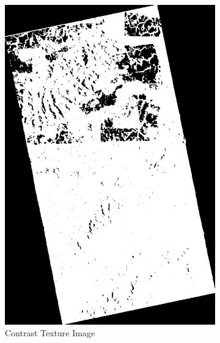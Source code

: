 \begin{figure}[H]
\begin{subfigure}[b]{0.4\linewidth}
    \includegraphics[width=\linewidth]{Chapter4/sum_and_diff_textures/contrastimage.png}
     \caption{Contrast Texture Image}
  \end{subfigure}
  \centering
  \begin{subfigure}[b]{0.4\linewidth}

\end{subfigure}
\end{figure}
